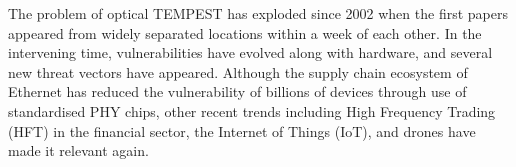 The problem of optical TEMPEST has exploded since 2002 when the first papers
appeared from widely separated locations within a week of each other. In the
intervening time, vulnerabilities have evolved along with hardware, and
several new threat vectors have appeared. Although the supply chain ecosystem
of Ethernet has reduced the vulnerability of billions of devices through use
of standardised PHY chips, other recent trends including High Frequency
Trading (HFT) in the financial sector, the Internet of Things (IoT), and
drones have made it relevant again.

